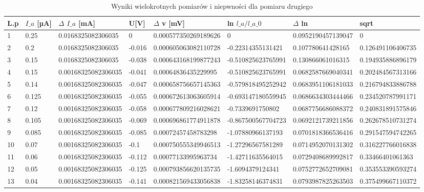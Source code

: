 \documentclass[a4paper]{article}
\begin{document}
\begin{table}[h!]
\centering
 \begin{tabular}{ | l | l | l | l | l | l | l | l | }
 \hline
 L.p & $I\_a$ [µA] & $\Delta$ $I\_a$ [mA] & U[V] & $\Delta$ v [mV] & ln $l\_a/l\_a\_0$ & $\Delta$ ln & sqrt \\ \hline
 1 & 0.25 & 0.0168325082306035 & 0 & 0.000577350269189626 & 0 & 0.0952190457139047 & 0 \\ \hline
 2 & 0.2 & 0.0168325082306035 & -0.016 & 0.000605063082110728 & -0.22314355131421 & 0.107780641428165 & 0.126491106406735 \\ \hline
 3 & 0.15 & 0.0168325082306035 & -0.038 & 0.000643168199877243 & -0.510825623765991 & 0.130866061016315 & 0.194935886896179 \\ \hline
 4 & 0.15 & 0.00168325082306035 & -0.041 & 0.00064836435229995 & -0.510825623765991 & 0.0682587669040341 & 0.202484567313166 \\ \hline
 5 & 0.14 & 0.00168325082306035 & -0.047 & 0.000658756657145363 & -0.579818495252942 & 0.0683951106181033 & 0.216794833886788 \\ \hline
 6 & 0.125 & 0.00168325082306035 & -0.055 & 0.000672613063605914 & -0.693147180559945 & 0.0686634303444466 & 0.234520787991171 \\ \hline
 7 & 0.12 & 0.00168325082306035 & -0.058 & 0.000677809216028621 & -0.7339691750802 & 0.0687756686088372 & 0.240831891575846 \\ \hline
 8 & 0.105 & 0.00168325082306035 & -0.069 & 0.000696861774911878 & -0.867500567704723 & 0.0692121739211856 & 0.262678510731274 \\ \hline
 9 & 0.085 & 0.00168325082306035 & -0.085 & 0.00072457458783298 & -1.07880966137193 & 0.0701818366536416 & 0.291547594742265 \\ \hline
 10 & 0.07 & 0.00168325082306035 & -0.1 & 0.000750555349946513 & -1.27296567581289 & 0.0714952070131302 & 0.316227766016838 \\ \hline
 11 & 0.06 & 0.00168325082306035 & -0.112 & 0.00077133995963734 & -1.42711635564015 & 0.0729408689992817 & 0.33466401061363 \\ \hline
 12 & 0.05 & 0.00168325082306035 & -0.125 & 0.000793856620135735 & -1.6094379124341 & 0.0752772652709081 & 0.353553390593274 \\ \hline
 13 & 0.04 & 0.00168325082306035 & -0.141 & 0.000821569433056838 & -1.83258146374831 & 0.0793987825263503 & 0.375499667110372 \\ \hline
 \end{tabular}
\caption{Wyniki wielokrotnych pomiarów i niepwności dla pomiaru drugiego}
\end{table}
\end{document}
